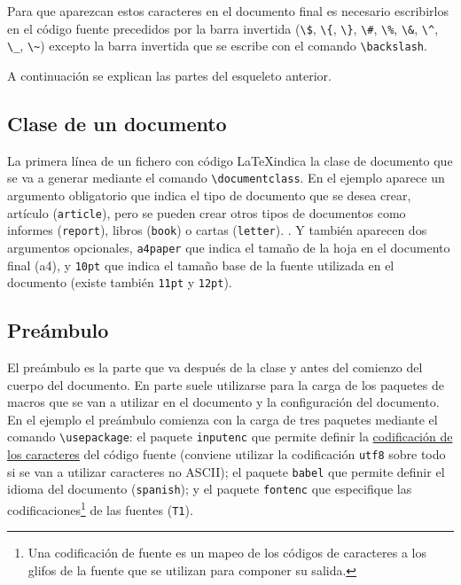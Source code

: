 \documentclass[
  letterpaper,
  DIV=11,
  numbers=noendperiod]{scrreport}
\begin{document}
Para que aparezcan estos caracteres en el documento final es necesario
escribirlos en el código fuente precedidos por la barra invertida
(\texttt{\textbackslash{}\$}, \texttt{\textbackslash{}\{},
\texttt{\textbackslash{}\}}, \texttt{\textbackslash{}\#},
\texttt{\textbackslash{}\%}, \texttt{\textbackslash{}\&},
\texttt{\textbackslash{}\^{}}, \texttt{\textbackslash{}\_},
\texttt{\textbackslash{}\textasciitilde{}}) excepto la barra invertida
que se escribe con el comando \texttt{\textbackslash{}backslash}.

A continuación se explican las partes del esqueleto anterior.

\hypertarget{clase-de-un-documento}{%
\subsection{Clase de un documento}\label{clase-de-un-documento}}

La primera línea de un fichero con código \LaTeX indica la clase de
documento que se va a generar mediante el comando
\texttt{\textbackslash{}documentclass}. En el ejemplo aparece un
argumento obligatorio que indica el tipo de documento que se desea
crear, artículo (\texttt{article}), pero se pueden crear otros tipos de
documentos como informes (\texttt{report}), libros (\texttt{book}) o
cartas (\texttt{letter}). . Y también aparecen dos argumentos
opcionales, \texttt{a4paper} que indica el tamaño de la hoja en el
documento final (a4), y \texttt{10pt} que indica el tamaño base de la
fuente utilizada en el documento (existe también \texttt{11pt} y
\texttt{12pt}).

\hypertarget{preuxe1mbulo}{%
\subsection{Preámbulo}\label{preuxe1mbulo}}

El preámbulo es la parte que va después de la clase y antes del comienzo
del cuerpo del documento. En parte suele utilizarse para la carga de los
paquetes de macros que se van a utilizar en el documento y la
configuración del documento. En el ejemplo el preámbulo comienza con la
carga de tres paquetes mediante el comando
\texttt{\textbackslash{}usepackage}: el paquete \texttt{inputenc} que
permite definir la
\href{https://es.wikipedia.org/wiki/Codificaci\%C3\%B3n_de_caracteres}{codificación
de los caracteres} del código fuente (conviene utilizar la codificación
\texttt{utf8} sobre todo si se van a utilizar caracteres no ASCII); el
paquete \texttt{babel} que permite definir el idioma del documento
(\texttt{spanish}); y el paquete \texttt{fontenc} que especifique las
codificaciones\footnote{Una codificación de fuente es un mapeo de los
  códigos de caracteres a los glifos de la fuente que se utilizan para
  componer su salida.} de las fuentes (\texttt{T1}).
\end{document}

